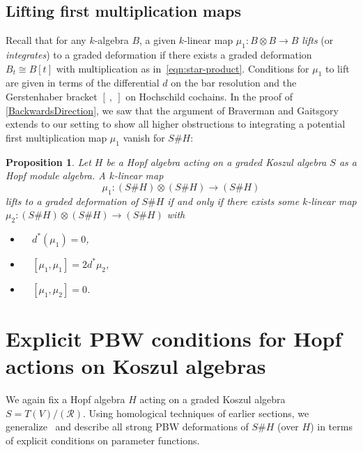 \documentclass[11pt]{amsart}
\numberwithin{equation}{section}
\newtheorem{prop}[equation]{Proposition}
\newcommand{\R}{\mathcal{R}}
\renewcommand{\_}[1]{\mbox{$_{\left( #1 \right)}$}}
\newcommand{\Ho}{H}%
\begin{document}
{\subsection*{Lifting first multiplication maps}
  Recall that for any $k$-algebra $B$,
  a given $k$-linear map
  $\mu_1: B\otimes B \rightarrow B$
  {\em lifts} (or {\em integrates})
  to a graded deformation if there exists a graded deformation $B_t\cong B[t]$
  with multiplication as in~\cref{eqn:star-product}. 
  Conditions for $\mu_1$ to lift are given in terms of the differential
  $d$ on the bar resolution and the Gerstenhaber bracket $[\ , \ ]$
  on Hochschild cochains.
  In the proof of \cref{BackwardsDirection},
  we saw that the argument of Braverman and Gaitsgory
  \cite{Braverman-Gaitsgory}
  extends to our setting to show all higher obstructions to integrating a potential
  first multiplication map $\mu_1$ vanish
  for $S\# \Ho$:

  \vspace{1ex}
  
\begin{prop}
Let $\Ho$ be a Hopf algebra acting 
on a graded Koszul algebra $S$ as a Hopf module algebra. 
A $k$-linear map $$\mu_1: (S\# \Ho)\otimes (S\# \Ho) \longrightarrow
(S\# \Ho)$$
lifts to a graded deformation of $S\# \Ho$ if and only if there exists some
$k$-linear map \\ $\mu_2: (S\# \Ho)\otimes (S\# \Ho) \rightarrow (S\# \Ho)$ with
  \begin{itemize}
    \item[(a)]\ \ $d^*(\mu_1) = 0$, 
    \item[(b)]\ \ $[\mu_1, \mu_1]=2d^*\mu_2$, 
    \item[(c)]\ \ $[\mu_1, \mu_2] = 0$.
    \end{itemize}
  \end{prop}
  
  \section{Explicit PBW conditions for
  Hopf actions on Koszul algebras}
\label{sec:DHAs}
We again fix a Hopf algebra $H$ acting on a graded Koszul
algebra $S=T(V)/(\R)$.
Using homological
techniques of earlier sections,
we generalize~\cite[Theorem 2.5]{SW-Koszul}
and describe all strong PBW deformations of $S\# H$
(over $H$)
in terms of explicit conditions
on parameter functions.


}
\end{document}
